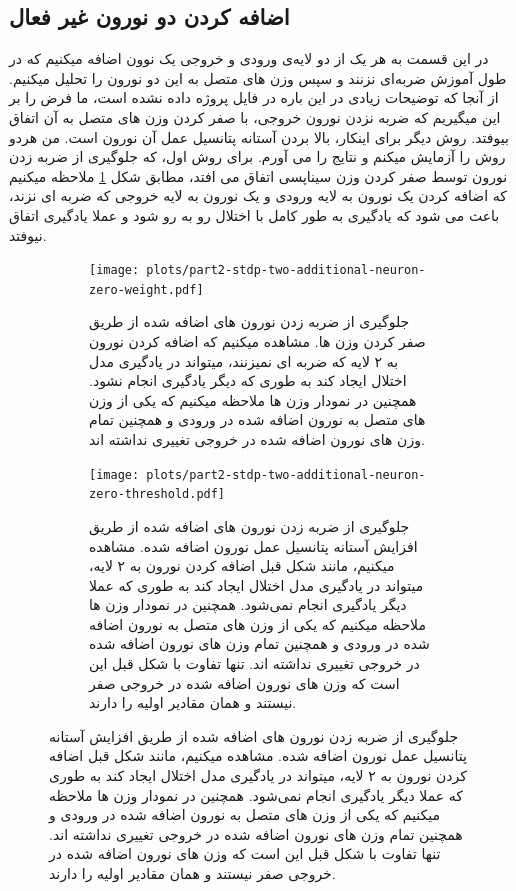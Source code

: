         \subsection{اضافه کردن دو نورون غیر فعال}
            در این قسمت به هر یک از دو لایه‌ی ورودی و خروجی یک نوون اضافه میکنیم که در طول آموزش ضربه‌ای نزنند و سپس وزن های متصل به این دو نورون را تحلیل میکنیم. از آنجا که توضیحات زیادی در این باره در فایل پروژه داده نشده است، ما فرض را بر این میگیریم که ضربه نزدن نورون خروجی، با صفر کردن وزن های متصل به آن اتفاق بیوفتد. روش دیگر برای اینکار، بالا بردن آستانه پتانسیل عمل آن نورون است. من هردو روش را آزمایش میکنم و نتایج را می آورم. برای روش اول،  که جلوگیری از ضربه زدن نورون توسط صفر کردن وزن سیناپسی اتفاق می افتد، مطابق شکل 
            \ref{fig:part2-stdp-two-additional-neuron-zero-weight}
            ملاحظه میکنیم که اضافه کردن یک نورون به لایه ورودی و یک نورون به لایه خروجی که ضربه ای نزند، باعث می شود که یادگیری به طور کامل با اختلال رو به رو شود و عملا یادگیری اتفاق نیوفتد.
            \begin{figure}[htbp]
                \centering
                \begin{subfigure}[b]{\linewidth}
                    \centering
                    \captionsetup{width=.9\linewidth}
                    \texttt{[image: plots/part2-stdp-two-additional-neuron-zero-weight.pdf]} 
                    \caption{جلوگیری از ضربه زدن نورون های اضافه شده از طریق صفر کردن وزن ها. مشاهده میکنیم که اضافه کردن نورون به ۲ لایه که ضربه ای نمیزنند، میتواند در یادگیری مدل اختلال ایجاد کند به طوری که دیگر یادگیری انجام نشود. همچنین در نمودار وزن ها ملاحظه میکنیم که یکی از وزن های متصل به نورون اضافه شده در ورودی و همچنین تمام وزن های نورون اضافه شده در خروجی تغییری نداشته اند.
                    }
                    \label{fig:part2-stdp-two-additional-neuron-zero-weight}
                \end{subfigure}
                \begin{subfigure}[b]{\linewidth}
                    \centering
                    \captionsetup{width=.9\linewidth}
                    \texttt{[image: plots/part2-stdp-two-additional-neuron-zero-threshold.pdf]} 
                    \caption{جلوگیری از ضربه زدن نورون های اضافه شده از طریق افزایش آستانه پتانسیل عمل نورون اضافه شده. مشاهده میکنیم، مانند شکل قبل اضافه کردن نورون به ۲ لایه، میتواند در یادگیری مدل اختلال ایجاد کند به طوری که عملا دیگر یادگیری انجام نمی‌شود. همچنین در نمودار وزن ها ملاحظه میکنیم که یکی از وزن های متصل به نورون اضافه شده در ورودی و همچنین تمام وزن های نورون اضافه شده در خروجی تغییری نداشته اند. تنها تفاوت با شکل قبل این است که وزن های نورون اضافه شده در خروجی صفر نیستند و همان مقادیر اولیه را دارند.
                    }
                    \label{fig:part2-stdp-two-additional-neuron-zero-threshold}
                \end{subfigure}
                \label{fig:part2-rstdp-two-additional-neuron}
            \end{figure}

